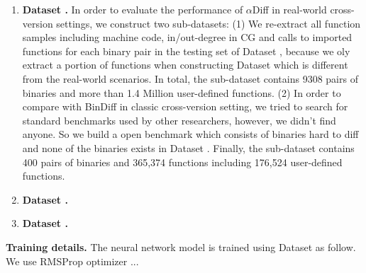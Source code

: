 \begin{enumerate}
\item \textbf{Dataset \uppercase\expandafter{}.}
In order to evaluate the performance of $\alpha$Diff in real-world cross-version settings, we construct two sub-datasets:
 (1) We re-extract all function samples including machine code, in/out-degree in CG and calls to imported functions for each binary pair in the testing set of Dataset \uppercase\expandafter{},
 because we oly extract a portion of functions when constructing Dataset \uppercase\expandafter{} which is different from the real-world scenarios. 
 In total, the sub-dataset contains 9308 pairs of binaries and more than 1.4 Million user-defined functions.
 (2) In order to compare with BinDiff in classic cross-version setting, we tried to search for standard benchmarks used by other researchers, however,
  we didn't find anyone. So we build a open benchmark which consists of binaries hard to diff and none of the binaries exists in Dataset \uppercase\expandafter{}.
  Finally, the sub-dataset contains 400 pairs of binaries and 365,374 functions including 176,524 user-defined functions.

\item \textbf{Dataset \uppercase\expandafter{}.}

\item \textbf{Dataset \uppercase\expandafter{}.}

\end{enumerate}

\textbf{Training details.} The neural network model is trained using Dataset \uppercase\expandafter{} as follow. 
We use RMSProp optimizer ...

